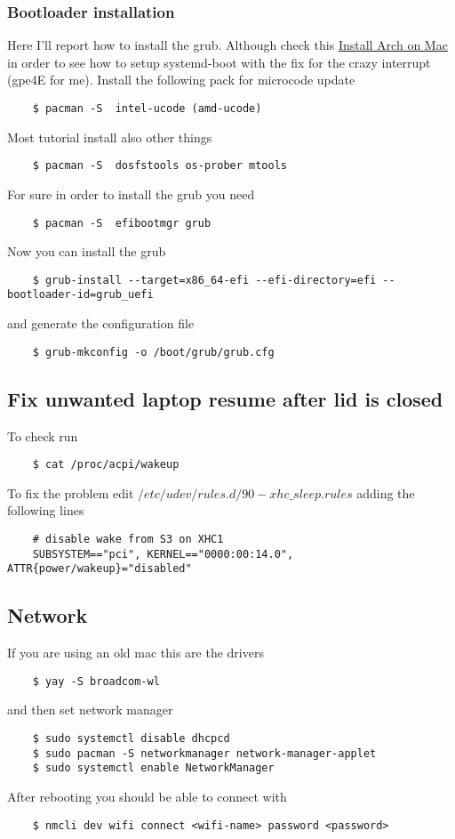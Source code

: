 \documentclass[12pt]{article}
\begin{document}
\subsubsection*{Bootloader installation}
Here I'll report how to install the grub. Although check this \href{https://medium.com/@laurynas.karvelis_95228/install-arch-linux-on-macbook-pro-11-2-retina-install-guide-for-year-2017-2034ceed4cb2}{Install Arch on Mac} in order to see how to setup systemd-boot with the fix for the crazy interrupt (gpe4E for me).
Install the following pack for microcode update
\begin{lstlisting}
    $ pacman -S  intel-ucode (amd-ucode)
\end{lstlisting}
Most tutorial install also other things
\begin{lstlisting}
    $ pacman -S  dosfstools os-prober mtools
\end{lstlisting}
For sure in order to install the grub you need
\begin{lstlisting}
    $ pacman -S  efibootmgr grub
\end{lstlisting}
Now you can install the grub
\begin{lstlisting}
    $ grub-install --target=x86_64-efi --efi-directory=efi --bootloader-id=grub_uefi
\end{lstlisting}
and generate the configuration file
\begin{lstlisting}
    $ grub-mkconfig -o /boot/grub/grub.cfg
\end{lstlisting}

\subsection*{Fix unwanted laptop resume after lid is closed}
To check run
\begin{lstlisting}
    $ cat /proc/acpi/wakeup
\end{lstlisting}
To fix the problem edit $/etc/udev/rules.d/90-xhc\_sleep.rules$ adding the following lines
\begin{lstlisting}
    # disable wake from S3 on XHC1
    SUBSYSTEM=="pci", KERNEL=="0000:00:14.0", ATTR{power/wakeup}="disabled"
\end{lstlisting}

\subsection*{Network}
If you are using an old mac this are the drivers
\begin{lstlisting}
    $ yay -S broadcom-wl
\end{lstlisting}
and then set network manager
\begin{lstlisting}
    $ sudo systemctl disable dhcpcd
    $ sudo pacman -S networkmanager network-manager-applet
    $ sudo systemctl enable NetworkManager
\end{lstlisting}
After rebooting you should be able to connect with
\begin{lstlisting}
    $ nmcli dev wifi connect <wifi-name> password <password>
\end{lstlisting}
\end{document}
